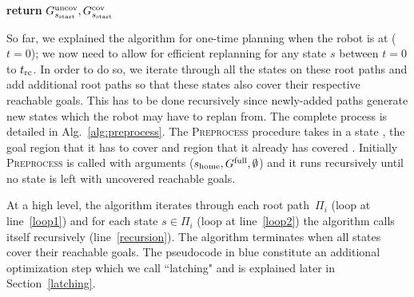 \documentclass[a4paper]{report}
\begin{document}
\begin{algorithm}[t]
\begin{algorithmic}[1]
    \EndFor
\EndFor
\EndIf
\State \textbf{return} $G^{\textrm{uncov}}_{s_{\textrm{start}}}, G^{\textrm{cov}}_{s_{\textrm{start}}}$
\EndProcedure
\end{algorithmic}
\end{algorithm}

%


So far, we explained the algorithm for one-time planning when the robot is at \Shome ($t = 0$); we now need to allow for efficient replanning for any state $s$ between $t = 0$ to $t_{\textrm{rc}}$. In order to do so, we iterate through all the states on these root paths and add additional root paths so that these states also cover their respective reachable goals. This has to be done recursively since newly-added paths generate new states which the robot may have to replan from. The complete process is detailed in Alg.~\ref{alg:preprocess}.
The \textsc{Preprocess} procedure takes in a state \Sstart, the goal region that it has to cover \Guncov and region that it already has covered \Gcov. Initially \textsc{Preprocess} is called with arguments ($s_{\textrm{home}}, G^{\textrm{full}}, \emptyset$) and it runs recursively until no state is left with uncovered reachable goals.
%

At a high level, the algorithm iterates through each root path~$\Pi_i$ (loop at line~\ref{loop1}) and for each state $s \in \Pi_i$ (loop at line~\ref{loop2}) the algorithm calls itself recursively (line~\ref{recursion}). The algorithm terminates when all states cover their reachable goals. The pseudocode in blue constitute an additional optimization step which we call ``latching" and is explained later in Section~\ref{latching}.
%
\end{document}

